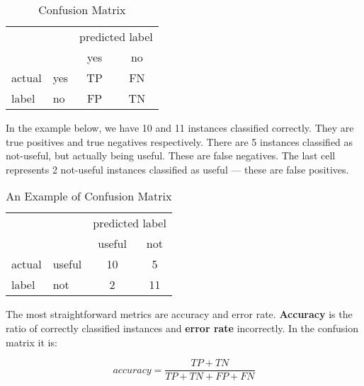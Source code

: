 \begin{table}[h!]
\center
\begin{tabular}{ll|c|c|}
\cline{3-4}
& & \multicolumn{2}{l|}{predicted label} \\
\cline{3-4}
& & yes & no \\
\hline
\multicolumn{1}{|l|}{actual}& yes & TP & FN\\
\cline{2-4}
\multicolumn{1}{|l|}{label}						   & no & FP & TN \\

\hline

\end{tabular}
	\caption{Confusion Matrix}\label{tab:confmatrix}
\end{table}

In the example below, we have 10 and 11 instances classified correctly. 
They are true positives and true negatives respectively.
There are 5 instances classified as not-useful, but actually being useful.
These are false negatives.
The last cell represents 2 not-useful instances classified as useful --- these are false positives.

\begin{table}[h!]
\center
\begin{tabular}{ll|c|c|}
\cline{3-4}
& & \multicolumn{2}{l|}{predicted label} \\
\cline{3-4}
& & useful & not \\
\hline
\multicolumn{1}{|l|}{actual}& useful & 10 & 5\\
\cline{2-4}
\multicolumn{1}{|l|}{label}						   & not & 2 & 11 \\

\hline

\end{tabular}
	\caption{An Example of Confusion Matrix}\label{tab:confmatrix_ex}
\end{table}


The most straightforward metrics are accuracy and error rate.
{\bf Accuracy} is the ratio of correctly classified instances and {\bf error rate} incorrectly.
In the confusion matrix it is:

\newcommand\TP{\mathit{TP}}  %
\newcommand\TN{\mathit{TN}}
\newcommand\FP{\mathit{FP}}
\newcommand\FN{\mathit{FN}}
\newcommand\ALL{\mathit{All}}
\begin{equation}
\mathit{accuracy} = \frac{\TP + \TN}{\TP + \TN + \FP + \FN}
\end{equation}

